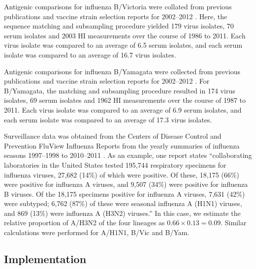 \documentclass[11pt,oneside,letterpaper]{article}
\begin{document}
Antigenic comparisons for influenza B/Victoria were collated from previous publications \cite{Rota90, Hay01, Muyanga01, Shaw02, Ansaldi04, Puzelli04, Xu04, Barr06, Daum06, Lin07} and vaccine strain selection reports for 2002--2012 \cite{AusWHO06, NIMR02, NIMR03, NIMR04, NIMRFeb05, NIMRSep05, NIMRMarch06, NIMRSep06, NIMRMarch07, NIMRSep07, NIMRMarch08, NIMRFeb09, NIMRSep09, NIMRFeb10, NIMRSep10, NIMRFeb11, NIMRSep11, NIMRFeb12}.
Here, the sequence matching and subsampling procedure yielded 179 virus isolates, 70 serum isolates and 2003 HI measurements over the course of 1986 to 2011.
Each virus isolate was compared to an average of 6.5 serum isolates, and each serum isolate was compared to an average of 16.7 virus isolates.

Antigenic comparisons for influenza B/Yamagata were collected from previous publications \cite{Rota90, Kanegae90, Nakajima92, Nerome98, Hay01, Muyanga01, Nakagawa02, Abed03, Ansaldi03, Ansaldi04, Matsuzaki04, Puzelli04, Shaw02, Xu04, Barr06, Daum06, Lin07} and vaccine strain selection reports for 2002--2012 \cite{AusWHO06, NIMR02, NIMR03, NIMR04, NIMRFeb05, NIMRSep05, NIMRMarch06, NIMRSep06, NIMRMarch07, NIMRSep07, NIMRMarch08, NIMRFeb09, NIMRSep09, NIMRFeb10, NIMRSep10, NIMRFeb11, NIMRSep11, NIMRFeb12}.
For B/Yamagata, the matching and subsampling procedure resulted in 174 virus isolates, 69 serum isolates and 1962 HI measurements over the course of 1987 to 2011.
Each virus isolate was compared to an average of 6.9 serum isolates, and each serum isolate was compared to an average of 17.3 virus isolates.

Surveillance data was obtained from the Centers of Disease Control and Prevention FluView Influenza Reports from the yearly summaries of influenza seasons 1997--1998 to 2010--2011 \cite{CDCReports}.
As an example, one report states ``collaborating laboratories in the United States tested 195,744 respiratory specimens for influenza viruses, 27,682 (14\%) of which were positive. Of these, 18,175 (66\%) were positive for influenza A viruses, and 9,507 (34\%) were positive for influenza B viruses. Of the 18,175 specimens positive for influenza A viruses, 7,631 (42\%) were subtyped; 6,762 (87\%) of these were seasonal influenza A (H1N1) viruses, and 869 (13\%) were influenza A (H3N2) viruses.''
In this case, we estimate the relative proportion of A/H3N2 of the four lineages as $0.66 \times 0.13 = 0.09$.
Similar calculations were performed for A/H1N1, B/Vic and B/Yam.

\subsection*{Implementation}
\end{document}
